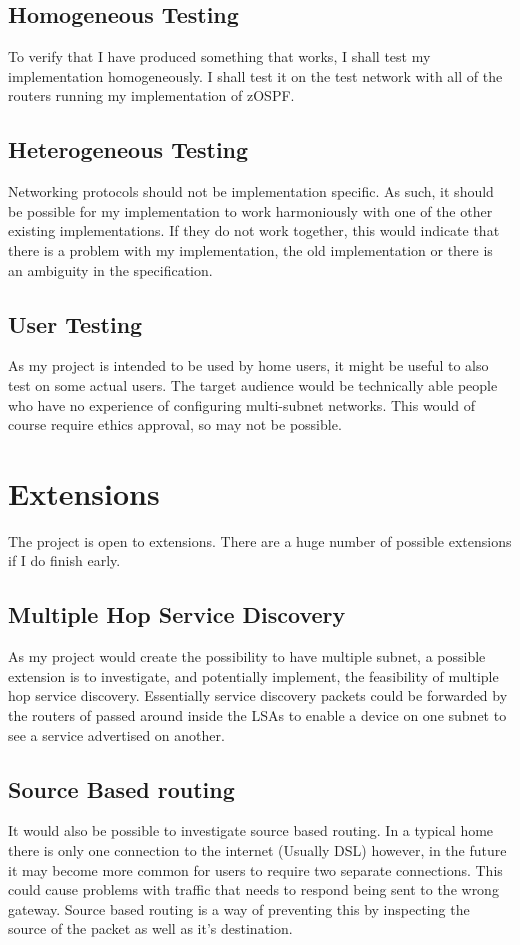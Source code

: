 \documentclass[12pt]{report}
\begin{document}
\subsection{Homogeneous Testing}
To verify that I have produced something that works, I shall test my
implementation homogeneously. I shall test it on the test network with all of
the routers running my implementation of zOSPF. 

\subsection{Heterogeneous Testing}
Networking protocols should not be implementation specific. As such, it should
be possible for my implementation to work harmoniously with one of the other
existing implementations. If they do not work together, this would indicate that
there is a problem with my implementation, the old implementation or there is an
ambiguity in the specification.

\subsection{User Testing}
As my project is intended to be used by home users, it might be useful to also
test on some actual users. The target audience would be technically able people
who have no experience of configuring multi-subnet networks. This would of course 
require ethics approval, so may not be possible.

\section{Extensions}

The project is open to extensions.  There are a huge number of possible
extensions if I do finish early.

\subsection{Multiple Hop Service Discovery}
As my project would create the possibility to have multiple subnet, a possible
extension is to investigate, and potentially implement, the feasibility of
multiple hop service discovery. Essentially service discovery packets could be
forwarded by the routers of passed around inside the LSAs to enable a device on
one subnet to see a service advertised on another.

\subsection{Source Based routing}
It would also be possible to investigate source based routing. In a typical home
there is only one connection to the internet (Usually DSL) however, in the
future it may become more common for users to require two separate connections.
This could cause problems with traffic that needs to respond being sent to the
wrong gateway. Source based routing is a way of preventing this by inspecting
the source of the packet as well as it's destination.
\end{document}
